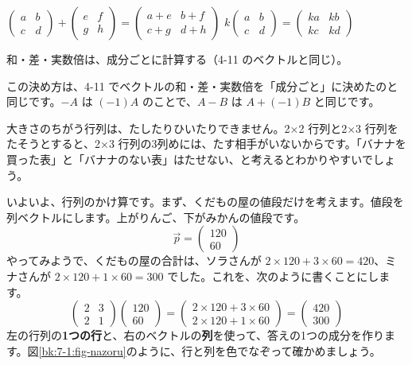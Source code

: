 \begin{taisetsu}
\centering
$\begin{pmatrix} a & b\\ c & d \end{pmatrix}+\begin{pmatrix} e & f\\ g & h \end{pmatrix}=\begin{pmatrix} a+e & b+f\\ c+g & d+h \end{pmatrix}$\qquad
$k\begin{pmatrix} a & b\\ c & d \end{pmatrix}=\begin{pmatrix} ka & kb\\ kc & kd \end{pmatrix}$\par\vspace{3pt}
{\small 和・差・実数倍は、成分ごとに計算する（4-11 のベクトルと同じ）。}
\end{taisetsu}

この決め方は、4-11 でベクトルの和・差・実数倍を「成分ごと」に決めたのと同じです。$-A$ は $(-1)A$ のことで、$A-B$ は $A+(-1)B$ と同じです。

大きさのちがう行列は、たしたりひいたりできません。2×2 行列と2×3 行列をたそうとすると、2×3 行列の3列めには、たす相手がいないからです。「バナナを買った表」と「バナナのない表」はたせない、と考えるとわかりやすいでしょう。


\label{bk:7-1:kakeru}いよいよ、行列のかけ算です。まず、くだもの屋の値段だけを考えます。値段を列ベクトルにします。上がりんご、下がみかんの値段です。
\[ \vec p=\begin{pmatrix} 120\\ 60 \end{pmatrix} \]
やってみようで、くだもの屋の合計は、ソラさんが $2\times120+3\times60=420$、ミナさんが $2\times120+1\times60=300$ でした。これを、次のように書くことにします。
\[ \begin{pmatrix} 2 & 3\\ 2 & 1 \end{pmatrix}\begin{pmatrix} 120\\ 60 \end{pmatrix}=\begin{pmatrix} 2\times120+3\times60\\ 2\times120+1\times60 \end{pmatrix}=\begin{pmatrix} 420\\ 300 \end{pmatrix} \]
左の行列の\textbf{1つの行}と、右のベクトルの\textbf{列}を使って、答えの1つの成分を作ります。図\ref{bk:7-1:fig-nazoru}のように、行と列を色でなぞって確かめましょう。

